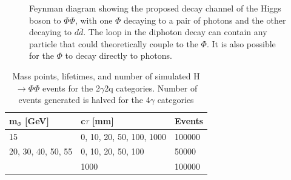 \begin{figure}[htb!]
	\centering
	
	\caption[Feynman diagram showing the proposed decay channel of the Higgs boson to $\Phi\Phi$, with one $\Phi$ decaying to a pair of photons and the other decaying to $d\bar{d}$. The loop in the diphoton decay can contain any particle that could theoretically couple to the $\Phi$. It is also possible for the $\Phi$ to decay directly to photons.]{Feynman diagram showing the proposed decay channel of the Higgs boson to $\Phi\Phi$, with one $\Phi$ decaying to a pair of photons and the other decaying to $d\bar{d}$. The loop in the diphoton decay can contain any particle that could theoretically couple to the $\Phi$. It is also possible for the $\Phi$ to decay directly to photons.}
	\label{fig:htophiphi}
\end{figure}

\begin{table}[htb!]
	\caption[Mass points, lifetimes, and number of simulated H $\rightarrow \Phi\Phi$ events for the 2$\gamma$2q categories. Number of events generated is halved for the 4$\gamma$ categories]{Mass points, lifetimes, and number of simulated H $\rightarrow \Phi\Phi$ events for the 2$\gamma$2q categories. Number of events generated is halved for the 4$\gamma$ categories}
	\label{tab:sigsamples}
	\begin{center}
		\begin{tabular}{l|l|l}
			\hline
			m$_\Phi$ [GeV] & c$\tau$ [mm] &  Events\\
			\hline
			15 & 0, 10, 20, 50, 100, 1000 & 100000\\
			\hline
			20, 30, 40, 50, 55 & 0, 10, 20, 50, 100 & 50000\\
			& 1000 & 100000\\
			\hline
		\end{tabular}
	\end{center}
\end{table}

